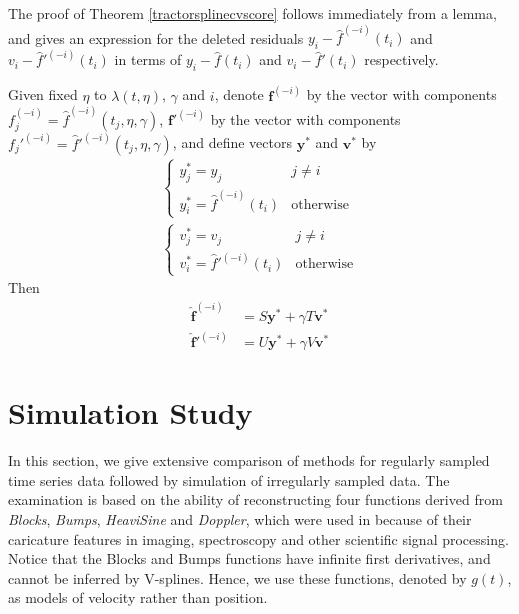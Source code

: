 The proof of Theorem \ref{tractorsplinecvscore} follows immediately from a lemma, and gives an expression for the deleted residuals $y_i-\hat{f}^{(-i)}(t_i)$ and $v_i-\hat{f}'^{(-i)}(t_i)$ in terms of $y_i-\hat{f}(t_i)$ and $v_i-\hat{f}'(t_i)$ respectively. 

\begin{lemma} \label{cvlemma}
Given fixed $\eta$ to $\lambda(t,\eta)$, $\gamma$ and $i$, denote $\mathbf{f}^{(-i)}$ by the vector with components $f_j^{(-i)}=\hat{f}^{(-i)}\left(t_j,\eta,\gamma\right)$,  $\mathbf{f}'^{(-i)}$ by the vector with components $f_j'^{(-i)}=\hat{f}'^{(-i)}\left(t_j,\eta,\gamma\right)$, and define vectors $\mathbf{y}^*$ and $\mathbf{v}^*$ by 
\begin{align}
\begin{cases}
y_j^*=y_j &j \neq i\\
y_i^*=\hat{f}^{(-i)}(t_i) &\mbox{otherwise}
\end{cases}\\
\begin{cases}
v_j^*=v_j &j \neq i\\
v_i^*=\hat{f}'^{(-i)}(t_i) &\mbox{otherwise}
\end{cases}
\end{align}
Then
\begin{align}
\mathbf{\hat{f}}^{(-i)}&=S\mathbf{y}^*+\gamma T\mathbf{v}^*\\
\mathbf{\hat{f}}'^{(-i)}&=U\mathbf{y}^*+\gamma V\mathbf{v}^*
\end{align}
\end{lemma}


\section{Simulation Study} %


In this section, we give extensive comparison of methods for regularly sampled time series data followed by simulation of irregularly sampled data. The examination is based on the ability of reconstructing four functions derived from \textit{Blocks}, \textit{Bumps}, \textit{HeaviSine} and \textit{Doppler}, which were used in \citep{donoho1994ideal, donoho1995adapting, abramovich1998wavelet} because of their caricature features in imaging, spectroscopy and other scientific signal processing. Notice that the Blocks and Bumps functions have infinite first derivatives, and cannot be inferred by V-splines. Hence, we use these functions, denoted by $g(t)$, as models of velocity rather than position. 

